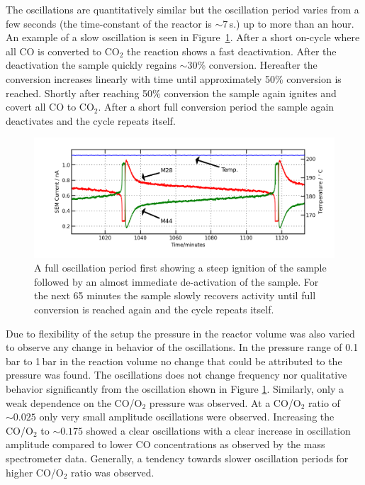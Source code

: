\documentclass[8.5pt,twoside,twocolumn]{article}
\begin{document}
The oscillations are quantitatively similar but the oscillation period varies from a few seconds (the time-constant of the reactor is $\sim7\,$s.) up to more than an hour. An example of a slow oscillation is seen in Figure~\ref{fgr:full_oscillation}. After a short on-cycle where all CO is converted to CO$_2$ the reaction shows a fast deactivation. After the deactivation the sample quickly regains $\sim$30\% conversion. Hereafter the conversion increases linearly with time until approximately 50\% conversion is reached. Shortly after reaching 50\% conversion the sample again ignites and covert all CO to CO$_2$. After a short full conversion period the sample again deactivates and the cycle repeats itself.
\begin{figure}
  \centering
  \includegraphics[width=17cm]{single_full_oscillation.png}
  \caption{A full oscillation period first showing a steep ignition of the sample followed by an almost immediate de-activation of the sample. For the next 65 minutes the sample slowly recovers activity until full conversion is reached again and the cycle repeats itself.}
  \label{fgr:full_oscillation}
\end{figure}
Due to flexibility of the setup the pressure in the reactor volume was also varied to observe any change in behavior of the oscillations. In the pressure range of 0.1\,bar to 1\,bar in the reaction volume no change that could be attributed to the pressure was found. The oscillations does not change frequency nor qualitative behavior significantly from the oscillation shown in Figure \ref{fgr:full_oscillation}. Similarly, only a weak dependence on the CO/O$_2$ pressure was observed. At a CO/O$_2$ ratio of $\sim0.025$ only very small amplitude oscillations were observed. Increasing the CO/O$_2$ to $\sim0.175$ showed a clear oscillations with a clear increase in oscillation amplitude compared to lower CO concentrations as observed by the mass spectrometer data. Generally, a tendency towards slower oscillation periods for higher CO/O$_2$ ratio was observed.
\end{document}
